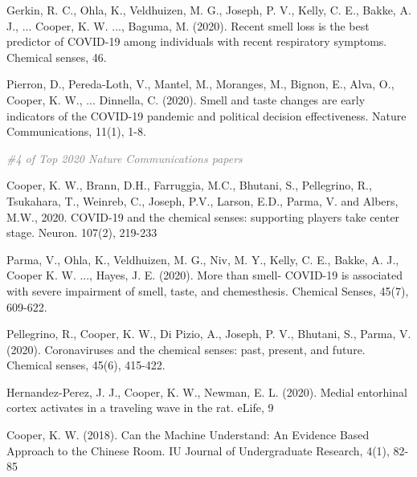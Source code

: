 \documentclass[10pt]{article}
\begin{document}
\begin{bibenum}
    \item   Gerkin, R. C., Ohla, K., Veldhuizen, M. G., Joseph, P. V., Kelly, C. E., Bakke, A. J., ... Cooper, K. W. ..., Baguma, M. (2020). Recent smell loss is the best predictor of COVID-19 among individuals with recent respiratory symptoms. Chemical senses, 46.

    \item   Pierron, D., Pereda-Loth, V., Mantel, M., Moranges, M., Bignon, E., Alva, O.,  Cooper, K. W., ... Dinnella, C. (2020). Smell and taste changes are early indicators of the COVID-19 pandemic and political decision effectiveness. Nature Communications, 11(1), 1-8.
 \begin{innerlist}
     \item  \textcolor{grey}{\textit{ \#4 of Top 2020 Nature Communications papers} }
 \end{innerlist}

    \item Cooper, K. W., Brann, D.H., Farruggia, M.C., Bhutani, S., Pellegrino, R., Tsukahara, T., Weinreb, C., Joseph, P.V., Larson, E.D., Parma, V. and Albers, M.W., 2020. COVID-19 and the chemical senses: supporting players take center stage. Neuron. 107(2), 219-233

    \item Parma, V., Ohla, K., Veldhuizen, M. G., Niv, M. Y., Kelly, C. E., Bakke, A. J., Cooper K. W. ..., Hayes, J. E. (2020). More than smell- COVID-19 is associated with severe impairment of smell, taste, and chemesthesis. Chemical Senses, 45(7), 609-622.

    \item Pellegrino, R., Cooper, K. W., Di Pizio, A., Joseph, P. V., Bhutani, S., Parma, V. (2020). Coronaviruses and the chemical senses: past, present, and future. Chemical senses, 45(6), 415-422.

    \item Hernandez-Perez, J. J., Cooper, K. W., Newman, E. L. (2020). Medial entorhinal cortex activates in a traveling wave in the rat. eLife, 9

    \item Cooper, K. W. (2018). Can the Machine Understand: An Evidence Based Approach to the Chinese Room. IU Journal of Undergraduate Research, 4(1), 82-85

\end{bibenum}

\end{document}
